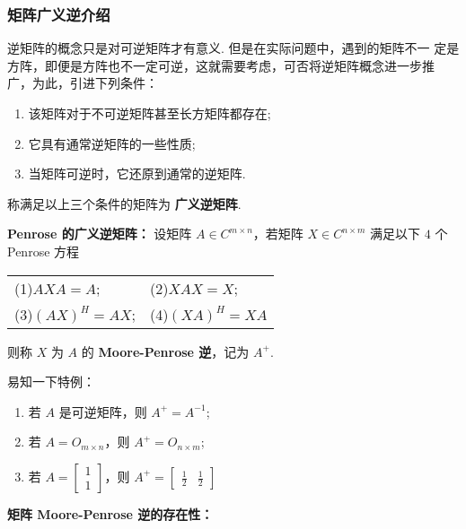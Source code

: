         \subsubsection{矩阵广义逆介绍}
            \par 逆矩阵的概念只是对可逆矩阵才有意义. 但是在实际问题中，遇到的矩阵不一 定是方阵，即便是方阵也不一定可逆，这就需要考虑，可否将逆矩阵概念进一步推 广，为此，引进下列条件：
            \begin{enumerate}
                \item 该矩阵对于不可逆矩阵甚至长方矩阵都存在;
                \item 它具有通常逆矩阵的一些性质;
                \item 当矩阵可逆时，它还原到通常的逆矩阵.
            \end{enumerate}
            称满足以上三个条件的矩阵为 \textbf{广义逆矩阵}.
            \\
            \par \textbf{Penrose 的广义逆矩阵：} 设矩阵 $A \in C^{m \times n}$，若矩阵 $X \in C^{n \times m}$ 满足以下 $4$ 个 Penrose 方程
            \begin{table}[htbp]
                \centering
                \begin{tabular}{ll}
                    (1)$AXA = A$; & (2)$XAX = X$; \\
                    (3)$(AX)^H = AX$; & (4)$(XA)^H = XA$ \\
                \end{tabular}
            \end{table}
            则称 $X$ 为 $A$ 的 \textbf{Moore-Penrose 逆}，记为 $A^{+}$.
            \par 易知一下特例：
            \begin{enumerate}
                \item 若 $A$ 是可逆矩阵，则 $A^{+} = A^{-1}$;
                \item 若 $A = O_{m \times n}$，则 $A^{+} = O_{n \times m}$;
                \item 若 $A = \begin{bmatrix}
                    1 \\ 1
                \end{bmatrix}$，则 $A^{+} = \begin{bmatrix}
                    \frac{1}{2} & \frac{1}{2}
                \end{bmatrix}$
            \end{enumerate}
            \par \textbf{矩阵 Moore-Penrose 逆的存在性：}

